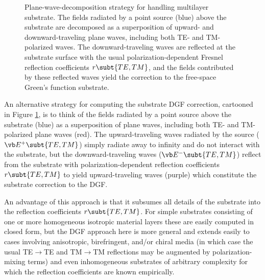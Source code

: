 \documentclass[letterpaper]{article}
\begin{document}
\begin{figure}
\begin{center}
\caption{Plane-wave-decomposition strategy for handling 
multilayer substrate. The fields radiated by a point source (blue)
above the substrate are decomposed as a superposition of
upward- and downward-traveling plane waves, including 
both TE- and TM-polarized waves. The downward-traveling waves
are reflected at the substrate surface with the usual
polarization-dependent Fresnel reflection coefficients $r\subt{TE,TM}$,
and the fields contributed by these reflected waves
yield the correction to the free-space Green's function
substrate.
}
\label{PlaneWaveFigure}
\end{center}
\end{figure}

An alternative strategy for computing the substrate DGF 
correction, cartooned in Figure \ref{PlaneWaveFigure}, is
to think of the fields radiated by a point source above
the substrate (blue) as a superposition of 
plane waves, including both TE- and TM-polarized
plane waves (red). The upward-traveling waves radiated by the 
source ($\vb E^+\subt{TE,TM}$) simply radiate away to 
infinity and do not interact with the substrate, but the
downward-traveling waves
($\vb E^-\subt{TE,TM}$) reflect from the substrate 
with polarization-dependent reflection coefficients
$r\subt{TE,TM}$ to yield upward-traveling waves (purple)
which constitute the substrate correction to the DGF.

An advantage of this approach is that it subsumes all details
of the substrate into the reflection coefficients $r\subt{TE,TM}$.
For simple substrates consisting of one or more homogeneous
isotropic material layers these are easily computed in closed
form, but the DGF approach here is more general and extends
easily to cases involving anisotropic, birefringent, and/or
chiral media (in which case the usual TE$\to$TE and TM$\to$TM
reflections may be augmented by polarization-mixing terms) and 
even inhomogeneous substrates of arbitrary complexity for which
the reflection coefficients are known empirically.

\end{document}
